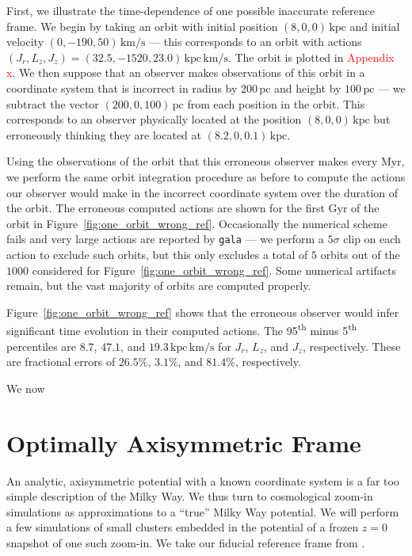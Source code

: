 \documentclass[twocolumn]{aastex62}
\newcommand{\Gus}[1]{\textcolor{red}{#1}}
\newcommand{\pc}{\text{pc}}
\newcommand{\kpc}{\text{kpc}}
\newcommand{\Myr}{\text{Myr}}
\newcommand{\Gyr}{\text{Gyr}}
\newcommand{\kms}{\text{km}/\text{s}}
\newcommand{\actunit}{\text{kpc}\,\kms}
\newcommand{\z}{z}
\begin{document}
First, we illustrate the time-dependence of one possible inaccurate reference
frame. We begin by taking an orbit with initial position $(8, 0, 0)\,\kpc$ and
initial velocity $(0, -190, 50)\,\kms$ --- this corresponds to an orbit with
actions $(J_r, L_z, J_z) = (32.5, -1520, 23.0)\,\actunit$. The orbit is
plotted in \Gus{Appendix x}. We then suppose that an observer makes
observations of this orbit in a coordinate system that is incorrect in radius by
$200\,\pc$ and height by $100\,\pc$ --- we subtract the vector $(200, 0,
100)\,\pc$ from each position in the orbit. This corresponds to an observer
physically located at the position $(8, 0, 0)\,\kpc$ but erroneously thinking
they are located at $(8.2, 0, 0.1)\,\kpc$.

Using the observations of the orbit that this erroneous observer makes every
$\Myr$, we perform the same orbit integration procedure as before to compute
the actions our observer would make in the incorrect coordinate system over the
duration of the orbit. The erroneous computed actions are shown for the first
$\Gyr$ of the orbit in Figure~\ref{fig:one_orbit_wrong_ref}. Occasionally the
numerical scheme fails and very large actions are reported by \texttt{gala}
--- we perform a $5\sigma$ clip on each action to exclude such orbits, but
this only excludes a total of $5$ orbits out of the $1000$ considered for
Figure~\ref{fig:one_orbit_wrong_ref}. Some numerical artifacts remain, but the
vast majority of orbits are computed properly.

Figure~\ref{fig:one_orbit_wrong_ref} shows that the erroneous observer would
infer significant time evolution in their computed actions. The
95\textsuperscript{th} minus 5\textsuperscript{th} percentiles are $8.7$,
$47.1$, and $19.3\,\actunit$ for $J_r$, $L_z$, and $J_z$, respectively. These
are fractional errors of $26.5\%$, $3.1\%$, and $81.4\%$, respectively.

\begin{figure*}
\caption{Caption.}
\label{fig:one_orbit_wrong_ref}
\end{figure*}

We now 

\section{Optimally Axisymmetric Frame} \label{sec:oa_frame}
An analytic, axisymmetric potential with a known coordinate system is a far
too simple description of the Milky Way. We thus turn to cosmological zoom-in
simulations as approximations to a ``true'' Milky Way potential. We will
perform a few simulations of small clusters embedded in the potential of a
frozen $\z=0$ snapshot of one such zoom-in. We take our fiducial reference
frame from \citet{2018arXiv180610564S}.
\end{document}

